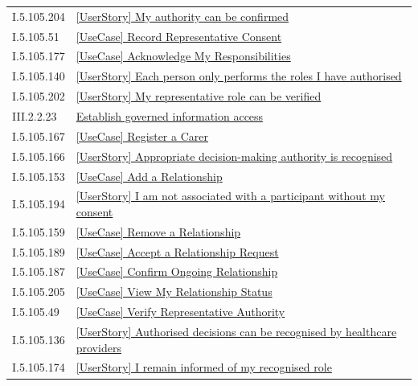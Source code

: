 \begin{longtable}{p{.22\linewidth}p{.73\linewidth}}
I.5.105.204 & \hyperref[element:18469dddf6d14f0d8d0de3602093b584]{[UserStory] My authority can be confirmed} \\
I.5.105.51 & \hyperref[element:1e4650edfd724a18b95901116a86583c]{[UseCase] Record Representative Consent} \\
I.5.105.177 & \hyperref[element:1fad14a854944d81b8e6a3906fc9133d]{[UseCase] Acknowledge My Responsibilities} \\
I.5.105.140 & \hyperref[element:1fd2cd6c5bf84ebeb97f01688d3631dd]{[UserStory] Each person only performs the roles I have authorised} \\
I.5.105.202 & \hyperref[element:22c6f7d14080489e965563bda301a97a]{[UserStory] My representative role can be verified} \\
III.2.2.23 & \hyperref[element:26719186d6444b5b80029fbf13ae7d06]{Establish governed information access} \\
I.5.105.167 & \hyperref[element:2a3aee22d464418583c217bab61962f2]{[UseCase] Register a Carer} \\
I.5.105.166 & \hyperref[element:2a8d72d8866a487bbfe680ba713f593a]{[UserStory] Appropriate decision-making authority is recognised} \\
I.5.105.153 & \hyperref[element:2e6364ff398b4ecaa0aa618412b68f69]{[UseCase] Add a Relationship} \\
I.5.105.194 & \hyperref[element:3836ec03096e47df8890f641e5ebcaf6]{[UserStory] I am not associated with a participant without my consent} \\
I.5.105.159 & \hyperref[element:39a3ba71fde842a7b0350de94729bcd5]{[UseCase] Remove a Relationship} \\
I.5.105.189 & \hyperref[element:3de2c42f76234f97b889ee258d6f1ce5]{[UseCase] Accept a Relationship Request} \\
I.5.105.187 & \hyperref[element:3ffd51a138974cdf9a0ac1164740e5bc]{[UseCase] Confirm Ongoing Relationship} \\
I.5.105.205 & \hyperref[element:4cdccb243b964b7fbc3fc708927d9bdc]{[UseCase] View My Relationship Status} \\
I.5.105.49 & \hyperref[element:4e59f2e2d8c04c728824fd652c20d102]{[UseCase] Verify Representative Authority} \\
I.5.105.136 & \hyperref[element:4e8f81a9bab149468e51d860b202770a]{[UserStory] Authorised decisions can be recognised by healthcare providers} \\
I.5.105.174 & \hyperref[element:511b2ebab39c4c5eb65606db398c4e83]{[UserStory] I remain informed of my recognised role} \\

\end{longtable}
